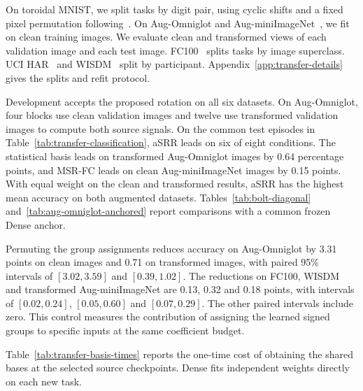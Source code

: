 On toroidal MNIST, we split tasks by digit pair, using cyclic shifts
and a fixed pixel permutation following~\citet{shakerinava2024weight}.
On Aug-Omniglot and Aug-miniImageNet~\cite{zhou2021meta}, we fit on
clean training images. We evaluate clean and transformed views of
each validation image and each test image.
FC100~\cite{oreshkin2018tadam} splits tasks by image superclass.
UCI HAR~\cite{reyes2013har} and WISDM~\cite{weiss2019wisdm} split by
participant. Appendix~\ref{app:transfer-details} gives the splits and
refit protocol.

Development accepts the proposed rotation on all six datasets. On
Aug-Omniglot, four blocks use clean validation images and twelve use
transformed validation images to compute both source signals.
On the common test episodes in Table~\ref{tab:transfer-classification},
aSRR leads on six of eight conditions. The statistical basis leads
on transformed Aug-Omniglot images by 0.64 percentage points, and
MSR-FC leads on clean Aug-miniImageNet images by 0.15 points. With
equal weight on the clean and transformed results, aSRR has the
highest mean accuracy on both augmented datasets.
Tables~\ref{tab:bolt-diagonal} and~\ref{tab:aug-omniglot-anchored}
report comparisons with a common frozen Dense anchor.



Permuting the group assignments reduces accuracy on Aug-Omniglot by
3.31 points on clean images and 0.71 on transformed images, with paired
95\% intervals of $[3.02,3.59]$ and $[0.39,1.02]$. The reductions on
FC100, WISDM and transformed Aug-miniImageNet are 0.13, 0.32 and 0.18
points, with intervals of $[0.02,0.24]$, $[0.05,0.60]$ and $[0.07,0.29]$.
The other paired intervals include zero. This control measures the
contribution of assigning the learned signed groups to specific
inputs at the same coefficient budget.

Table~\ref{tab:transfer-basis-times} reports the one-time cost of
obtaining the shared bases at the selected source checkpoints. Dense
fits independent weights directly on each new task.

\FloatBarrier
